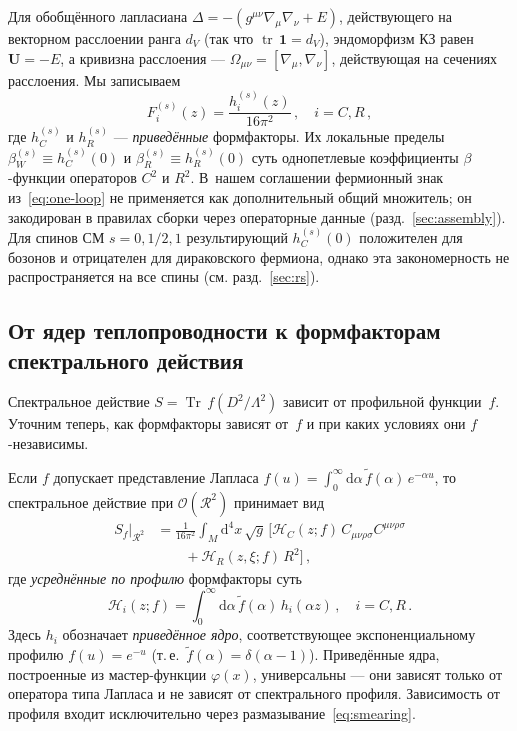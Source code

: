 \documentclass[aps,prd,twocolumn,superscriptaddress,nofootinbib,floatfix]{revtex4-2}
\theoremstyle{definition}
\theoremstyle{remark}
\newcommand{\Weylsq}{C_{\mu\nu\rho\sigma}C^{\mu\nu\rho\sigma}}
\newcommand{\dd}{\mathrm{d}}
\newcommand{\tr}{\operatorname{tr}}
\newcommand{\Tr}{\operatorname{Tr}}
\begin{document}
Для обобщённого лапласиана $\Delta = -(g^{\mu\nu}\nabla_\mu\nabla_\nu + E)$,
действующего на векторном расслоении ранга $d_V$ (так что
$\tr\,\mathbf{1} = d_V$), эндоморфизм КЗ равен $\mathbf{U} = -E$, а
кривизна расслоения --- $\Omega_{\mu\nu} = [\nabla_\mu, \nabla_\nu]$,
действующая на сечениях расслоения. Мы записываем
\begin{equation}
  F_i^{(s)}(z) = \frac{h_i^{(s)}(z)}{16\pi^2}\,,\quad i = C, R\,,
  \label{eq:Fi-hi-def}
\end{equation}
где $h_C^{(s)}$ и $h_R^{(s)}$ --- \emph{приведённые} формфакторы.
Их локальные пределы $\beta_W^{(s)} \equiv h_C^{(s)}(0)$ и
$\beta_R^{(s)} \equiv h_R^{(s)}(0)$ суть однопетлевые коэффициенты
$\beta$-функции операторов $C^2$ и $R^2$. В~нашем соглашении фермионный
знак из~\eqref{eq:one-loop} не применяется как дополнительный общий
множитель; он закодирован в правилах сборки через операторные данные
(разд.~\ref{sec:assembly}). Для спинов СМ $s = 0, 1/2, 1$ результирующий
$h_C^{(s)}(0)$ положителен для бозонов и отрицателен для дираковского
фермиона, однако эта закономерность не распространяется на все спины
(см. разд.~\ref{sec:rs}).

\subsection{От ядер теплопроводности к формфакторам спектрального действия}
\label{sec:smearing}

Спектральное действие $S = \Tr\,f(D^2/\Lambda^2)$ зависит от профильной
функции~$f$. Уточним теперь, как формфакторы зависят от~$f$ и при каких
условиях они $f$-независимы.

Если $f$ допускает представление Лапласа
$f(u) = \int_0^\infty \dd\alpha\,\tilde{f}(\alpha)\,e^{-\alpha u}$,
то спектральное действие при $\mathcal{O}(\mathcal{R}^2)$ принимает вид
\begin{align}
  S_f\big|_{\mathcal{R}^2}
  &= \frac{1}{16\pi^2}\int_M \dd^4x\,\sqrt{g}\,\bigl[
    \mathcal{H}_C(z;f)\,\Weylsq
  \nonumber\\
  &\qquad + \mathcal{H}_R(z,\xi;f)\,R^2
  \bigr]\,,
  \label{eq:smeared-action}
\end{align}
где \emph{усреднённые по профилю} формфакторы суть
\begin{equation}
  \mathcal{H}_i(z;f) = \int_0^\infty \dd\alpha\,\tilde{f}(\alpha)\,
    h_i(\alpha z)\,,\quad i = C,R\,.
  \label{eq:smearing}
\end{equation}
Здесь $h_i$ обозначает \emph{приведённое ядро}, соответствующее
экспоненциальному профилю $f(u) = e^{-u}$ (т.\,е.\
$\tilde{f}(\alpha) = \delta(\alpha - 1)$). Приведённые ядра, построенные
из мастер-функции $\varphi(x)$, универсальны --- они зависят только от
оператора типа Лапласа и не зависят от спектрального профиля. Зависимость
от профиля входит исключительно через размазывание~\eqref{eq:smearing}.
\end{document}
